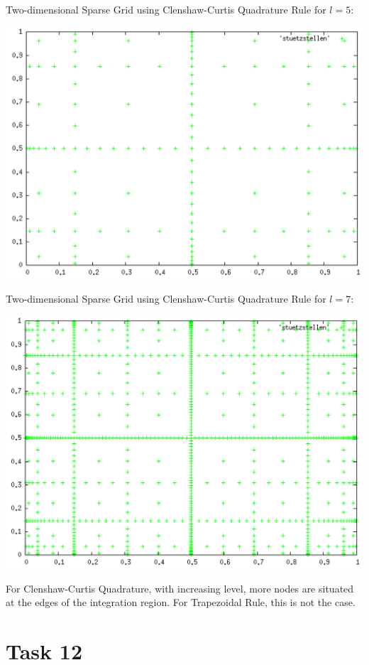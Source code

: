 \documentclass[10pt,a4paper]{article}
\begin{document}
Two-dimensional Sparse Grid using Clenshaw-Curtis Quadrature Rule for $l=5$:
\begin{center}
\includegraphics[scale=0.5]{clenshaw_curtis_l5.png}	
\end{center}

Two-dimensional Sparse Grid using Clenshaw-Curtis Quadrature Rule for $l=7$:
\begin{center}
\includegraphics[scale=0.5]{clenshaw_curtis_l7.png}	
\end{center}
For Clenshaw-Curtis Quadrature, with increasing level, more nodes are situated at the edges of the integration region. For Trapezoidal Rule, this is not the case.

\section*{Task 12}
\end{document}
